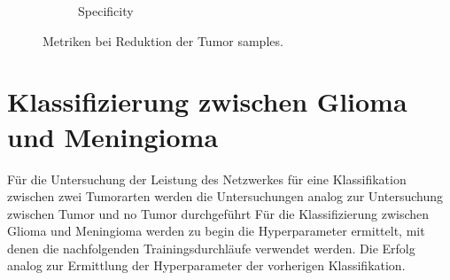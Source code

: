 \begin{figure}[H]
\begin{subfigure}[b]{0.48\textwidth}
    \caption{Specificity}
    \label{fig:reduzierung_tu_specificity}
  \end{subfigure}
  \caption{Metriken bei Reduktion der Tumor samples.}
  \label{fig:reduzierung_tumorsamples}
\end{figure}

\section{Klassifizierung zwischen Glioma und Meningioma}
Für die Untersuchung der Leistung des Netzwerkes für eine Klassifikation zwischen zwei Tumorarten werden die Untersuchungen analog zur Untersuchung 
zwischen Tumor und no Tumor durchgeführt
Für die Klassifizierung zwischen Glioma und Meningioma werden zu begin die Hyperparameter ermittelt, mit denen die nachfolgenden
Trainingsdurchläufe verwendet werden. 
Die Erfolg analog zur Ermittlung der Hyperparameter der vorherigen Klassifikation.
